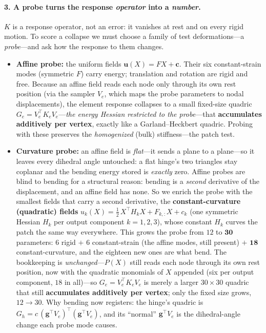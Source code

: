 \paragraph{3. A probe turns the response \emph{operator} into a \emph{number}.}
$K$ is a response operator, not an error: it vanishes at rest and on every rigid motion.
To score a collapse we must choose a family of test deformations---a \emph{probe}---and ask how the response to them changes.
\begin{itemize}
  \item \textbf{Affine probe:} the uniform fields $\mathbf{u}(X)=FX+\mathbf{c}$.
        Their six constant-strain modes (symmetric $F$) carry energy; translation and rotation are rigid and free.
        Because an affine field reads each node only through its own rest position (via the sampler $V_e$, which maps the probe parameters to nodal displacements), the element response collapses to a small fixed-size quadric $G_e=V_e^\top K_e V_e$---\emph{the energy Hessian restricted to the probe}---that \textbf{accumulates additively per vertex}, exactly like a Garland--Heckbert quadric.
        Probing with these preserves the \emph{homogenized} (bulk) stiffness---the patch test.
  \item \textbf{Curvature probe:} an affine field is \emph{flat}---it sends a plane to a plane---so it leaves every dihedral angle untouched: a flat hinge's two triangles stay coplanar and the bending energy stored is \emph{exactly} zero.
        Affine probes are blind to bending for a structural reason: bending is a \emph{second} derivative of the displacement, and an affine field has none.
        So we enrich the probe with the smallest fields that carry a second derivative, the \textbf{constant-curvature (quadratic) fields} $u_k(X)=\tfrac12\,X^\top H_k X+F_{k,:}X+c_k$ (one symmetric Hessian $H_k$ per output component $k=1,2,3$), whose constant $H_k$ curves the patch the same way everywhere.
        This grows the probe from $12$ to $\mathbf{30}$ parameters: $6$ rigid $+$ $6$ constant-strain (the affine modes, still present) $+$ $\mathbf{18}$ constant-curvature, and the eighteen new ones are what bend.
        The bookkeeping is \emph{unchanged}---$P(X)$ still reads each node through its own rest position, now with the quadratic monomials of $X$ appended (six per output component, $18$ in all)---so $G_e=V_e^\top K_e V_e$ is merely a larger $30\times30$ quadric that still \textbf{accumulates additively per vertex}; only the fixed size grows, $12\to30$.
        Why bending now registers: the hinge's quadric is $G_h=c\,(\mathbf{g}^\top V_e)^\top(\mathbf{g}^\top V_e)$, and its ``normal'' $\mathbf{g}^\top V_e$ is the dihedral-angle change each probe mode causes.

\end{itemize}
